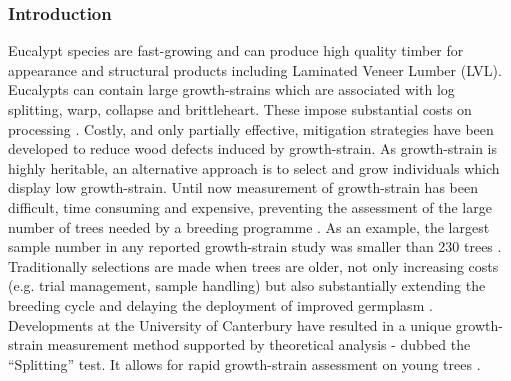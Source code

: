 \subsubsection*{Introduction}
Eucalypt species are fast-growing and can produce high quality timber for appearance and structural products including Laminated Veneer Lumber (LVL). Eucalypts can contain large growth-strains which are associated with log splitting, warp, collapse and brittleheart. These impose substantial costs on processing \citep{yamamoto2007slides}. Costly, and only partially effective, mitigation strategies have been developed to reduce wood defects induced by growth-strain. As growth-strain is highly heritable, an alternative approach is to select and grow individuals which display low growth-strain. Until now measurement of growth-strain has been difficult, time consuming and expensive, preventing the assessment of the large number of trees needed by a breeding programme \citep{altaner_developing2015}. As an example, the largest sample number in any reported growth-strain study was smaller than 230 trees \citep{naranjo2012early}. Traditionally selections are made when trees are older, not only increasing costs (e.g. trial management, sample handling) but also substantially extending the breeding cycle and delaying the deployment of improved germplasm \citep{altaner_developing2015}. Developments at the University of Canterbury have resulted in a unique growth-strain measurement method supported by theoretical analysis \citep{Entwistle_2014} - dubbed the “Splitting” test. It allows for rapid growth-strain assessment on young trees \citep{Chauhan_2010}.

